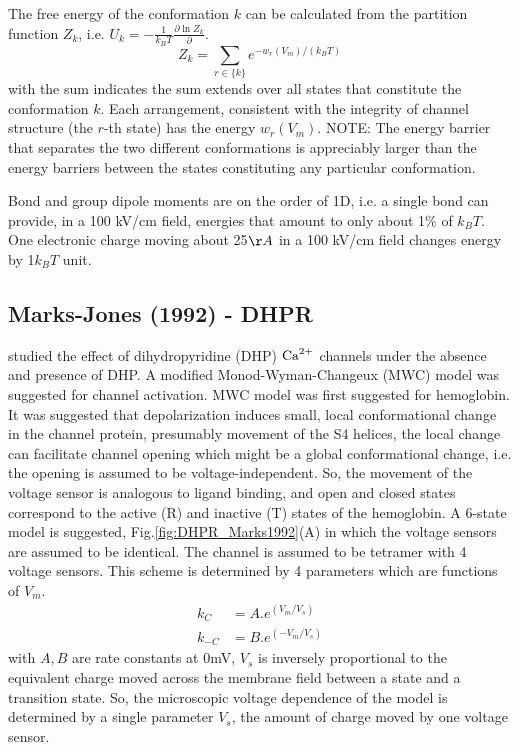 The free energy of the conformation $k$ can be calculated from the partition
function $Z_k$, i.e. $U_k = -\frac{1}{k_BT}\frac{\partial \ln Z_k}{\partial}$. 
\begin{equation}
Z_k = \sum_{r\in \{k\}} e^{-w_r(V_m)/(k_BT)}
\end{equation}
with the sum indicates the sum extends over all states that constitute the
conformation $k$. Each arrangement, consistent with the integrity of channel
structure (the $r$-th state) has the energy $w_r(V_m)$. NOTE: The energy barrier
that separates the two different conformations is appreciably larger than the
energy barriers between the states constituting any particular conformation. 

\begin{framed}
Bond and group dipole moments are on the order of 1D, i.e. a single bond can
provide, in a 100 kV/cm field, energies that amount to only about 1\% of $k_BT$.
One electronic charge moving about 25$\AA$ in a 100 kV/cm field
changes energy by 1$k_BT$ unit. 
\end{framed}

\subsection{Marks-Jones (1992) - DHPR}
\label{sec:DHPR_Marks1992}

\citep{marks1992} studied the effect of dihydropyridine (DHP) ${\text{Ca}^{2+}}$ channels
under the absence and presence of DHP. A modified Monod-Wyman-Changeux (MWC)
model was suggested for channel activation. MWC model was first suggested for
hemoglobin. It was suggested that depolarization induces small, local
conformational change in the channel protein, presumably movement of the S4
helices, the local change can facilitate channel opening which might be a global
conformational change, i.e. the opening is assumed to be voltage-independent.
So, the movement of the voltage sensor is analogous to ligand binding, and open
and closed states correspond to the active (R) and inactive (T) states of the
hemoglobin. A 6-state model is suggested, Fig.\ref{fig:DHPR_Marks1992}(A) in
which the voltage sensors are assumed to be identical. The channel is assumed to
be tetramer with 4 voltage sensors. This scheme is determined by 4 parameters
which are functions of $V_m$.
\begin{equation}
\begin{split}
k_C &= A.e^{(V_m/V_s)} \\
k_{-C} &= B.e^{(-V_m/V_s)}
\end{split}
\end{equation}
with $A,B$ are rate constants at 0mV, $V_s$ is inversely proportional to the
equivalent charge moved across the membrane field between a state and a
transition state. So, the microscopic voltage dependence of the model is
determined by a single parameter $V_s$, the amount of charge moved by one
voltage sensor.

